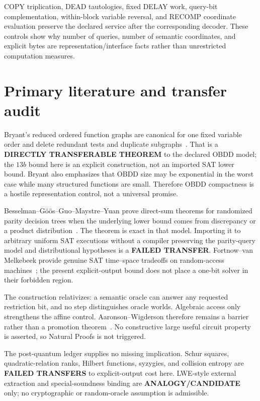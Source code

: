 \documentclass[11pt]{article}
\begin{document}
COPY triplication, DEAD tautologies, fixed DELAY work, query-bit
complementation, within-block variable reversal, and RECOMP coordinate
evaluation preserve the declared service after the corresponding decoder.
These controls show why number of queries, number of semantic coordinates,
and explicit bytes are representation/interface facts rather than
unrestricted computation measures.

\section{Primary literature and transfer audit}
Bryant's reduced ordered function graphs are canonical for one fixed variable
order and delete redundant tests and duplicate subgraphs~\cite{bryant}.
That is a \textbf{DIRECTLY TRANSFERABLE THEOREM} to the declared OBDD model;
the $13b$ bound here is an explicit construction, not an imported SAT lower
bound.  Bryant also emphasizes that OBDD size may be exponential in the worst
case while many structured functions are small.  Therefore OBDD compactness
is a hostile representation control, not a universal promise.

Besselman--G\"o\"os--Guo--Maystre--Yuan prove direct-sum theorems for
randomized parity decision trees when the underlying lower bound comes from
discrepancy or a product distribution~\cite{directsum}.  The theorem is exact
in that model.  Importing it to arbitrary uniform SAT executions without a
compiler preserving the parity-query model and distributional hypotheses is
a \textbf{FAILED TRANSFER}.  Fortnow--van Melkebeek provide genuine SAT
time--space tradeoffs on random-access machines~\cite{fv}; the present
explicit-output bound does not place a one-bit solver in their forbidden
region.

The construction relativizes: a semantic oracle can answer any requested
restriction bit, and no step distinguishes oracle worlds.  Algebraic access
only strengthens the affine control.  Aaronson--Wigderson therefore remains
a barrier rather than a promotion theorem~\cite{aw}.  No constructive large
useful circuit property is asserted, so Natural Proofs is not triggered.

The post-quantum ledger supplies no missing implication.  Schur squares,
quadratic-relation ranks, Hilbert functions, syzygies, and collision entropy
are \textbf{FAILED TRANSFERS} to explicit-output cost here.  LWE-style
external extraction and special-soundness binding are
\textbf{ANALOGY/CANDIDATE} only; no cryptographic or random-oracle assumption
is admissible.
\end{document}
